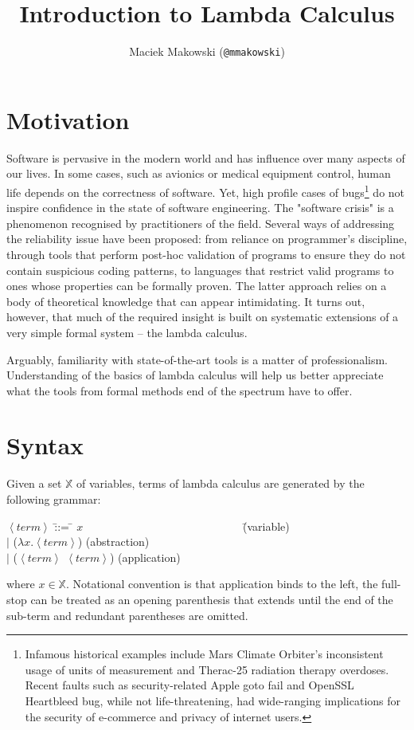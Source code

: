 \documentclass[11pt,twoside,a4paper]{article} %
\newcommand{\nonterm}[1]{$\left<#1\right>$}
\newcommand{\alt}[0]{$|$}
\begin{document}
\title{Introduction to Lambda Calculus}
\author{Maciek Makowski (\texttt{@mmakowski})}
\maketitle

\section{Motivation}

Software is pervasive in the modern world and has influence over many aspects 
of our lives. In some cases, such as avionics or medical equipment control, 
human life depends on the correctness of software. Yet, high profile cases of 
bugs\footnote{Infamous historical examples include Mars Climate 
Orbiter's inconsistent usage of units of measurement\cite{mco} and Therac-25 
radiation therapy overdoses\cite{therac25}. Recent faults such as
security-related Apple goto fail\cite{cve141266} and OpenSSL Heartbleed
bug\cite{cve140160},
while not life-threatening, had wide-ranging implications for the security of
e-commerce and privacy of internet users.} do not inspire confidence in the 
state of software engineering. The "software crisis" is a phenomenon recognised 
by practitioners of the field. Several ways of addressing the reliability issue 
have been proposed: from reliance on programmer's 
discipline\cite{cleancode}\cite{securecoding}, through tools that
perform post-hoc validation of programs to ensure they do not contain suspicious
coding patterns\cite{raf04}, to languages 
that restrict valid programs to ones whose properties can be formally proven. 
The latter approach relies on a body of 
theoretical knowledge that can appear intimidating. It turns out, 
however, that much of the required insight is built on systematic extensions of 
a very simple formal system -- the lambda calculus. 

Arguably, familiarity with state-of-the-art tools is a matter of professionalism. 
Understanding of the basics of lambda calculus will help us better
appreciate what the tools from formal methods end of the spectrum have to
offer.

\section{Syntax}

Given a set $\mathbb{X}$ of variables, terms of lambda calculus are generated by the 
following grammar:
\begin{tabbing}
\nonterm{term} \= ::=  \= $x$~~~~~~~~~~~~~~~~~~~~~~~~~~~~ \= (variable)    \\
               \> \alt \> ($\lambda x.$\nonterm{term})    \> (abstraction) \\
               \> \alt \> (\nonterm{term} \nonterm{term}) \> (application) 
\end{tabbing}
where $x\in \mathbb{X}$. Notational convention is that application binds to the left, the 
full-stop can be treated as an opening parenthesis that extends until the end of 
the sub-term and redundant parentheses are omitted. 
\end{document}
